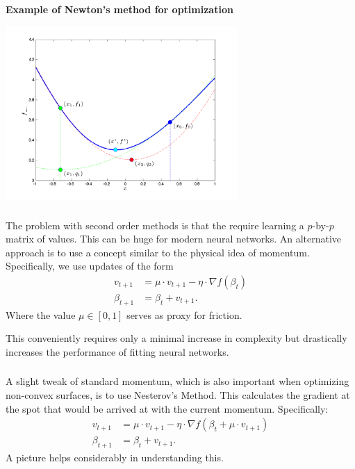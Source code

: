 \documentclass[xetex,mathserif,serif,aspectratio=169]{beamer}
\begin{document}
\begin{frame}[fragile] \frametitle{} \oldB \small

\textbf{Example of Newton's method for optimization}

\begin{center}
\includegraphics[width=0.66\textwidth]{img/cp_newton_conv.png}
\end{center}

\end{frame}

\begin{frame}[fragile] \frametitle{} \oldB \small

\textbf{}

The problem with second order methods is that the require learning
a $p$-by-$p$ matrix of values. This can be huge for modern neural
networks. An alternative approach is to use a concept similar to
the physical idea of momentum. Specifically, we use updates of
the form
\begin{align*}
v_{t+1} &= \mu \cdot v_{t+1} - \eta \cdot \nabla f(\beta_{t}) \\
\beta_{t+1} &= \beta_{t} + v_{t+1}.
\end{align*}
Where the value $\mu \in [0,1]$ serves as proxy for friction.

This conveniently requires only a minimal increase in complexity
but drastically increases the performance of fitting neural networks.

\end{frame}


\begin{frame}[fragile] \frametitle{} \oldB \small

\textbf{}

A slight tweak of standard momentum, which is also important
when optimizing non-convex surfaces, is to use Nesterov's Method.
This calculates the gradient at the spot that would be arrived
at with the current momentum. Specifically:
\begin{align*}
v_{t+1} &= \mu \cdot v_{t+1} - \eta \cdot \nabla f(\beta_t + \mu \cdot v_{t+1}) \\
\beta_{t+1} &= \beta_{t} + v_{t+1}.
\end{align*}
A picture helps considerably in understanding this.

\end{frame}
\end{document}
